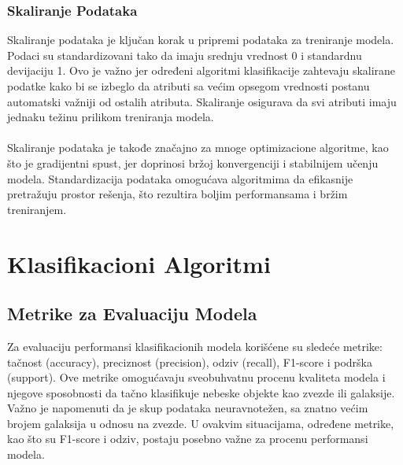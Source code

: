 \documentclass[a4paper,12pt]{article}
\begin{document}
\subsubsection{Skaliranje Podataka}
Skaliranje podataka je ključan korak u pripremi podataka za treniranje modela. Podaci su standardizovani tako da imaju srednju vrednost 0 i standardnu devijaciju 1. Ovo je važno jer određeni algoritmi klasifikacije zahtevaju skalirane podatke kako bi se izbeglo da atributi sa većim opsegom vrednosti postanu automatski važniji od ostalih atributa. Skaliranje osigurava da svi atributi imaju jednaku težinu prilikom treniranja modela.\\\\
Skaliranje podataka je takođe značajno za mnoge optimizacione algoritme, kao što je gradijentni spust, jer doprinosi bržoj konvergenciji i stabilnijem učenju modela. Standardizacija podataka omogućava algoritmima da efikasnije pretražuju prostor rešenja, što rezultira boljim performansama i bržim treniranjem.



\section{Klasifikacioni Algoritmi}

\subsection{Metrike za Evaluaciju Modela}
Za evaluaciju performansi klasifikacionih modela korišćene su sledeće metrike: tačnost (accuracy), preciznost (precision), odziv (recall), F1-score i podrška (support). Ove metrike omogućavaju sveobuhvatnu procenu kvaliteta modela i njegove sposobnosti da tačno klasifikuje nebeske objekte kao zvezde ili galaksije.\\
Važno je napomenuti da je skup podataka neuravnotežen, sa znatno većim brojem galaksija u odnosu na zvezde. U ovakvim situacijama, određene metrike, kao što su F1-score i odziv, postaju posebno važne za procenu performansi modela.
\end{document}
